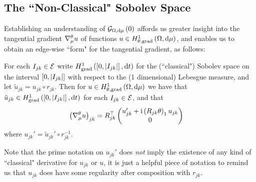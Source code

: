 \subsection{The ``Non-Classical" Sobolev Space} \label{appS:SobSpacesTheory}
Establishing an understanding of $\mathcal{G}_{ \Omega, \mathrm{d}\mu}\left( 0 \right)$  affords us greater insight into the tangential gradient $\nabla^{\theta}_\mu u$ of functions $u\in H^1_{\theta, \mathrm{grad}}\left( \Omega, \mathrm{d}\mu \right)$, and enables us to obtain an edge-wise ``form" for the tangential gradient, as follows:
\begin{prop} \label{prop:GraphTangGrad}
	For each $I_{jk}\in \mathcal{E}$ write $H^1_\mathrm{grad}\left( \left[ 0,\left\lvert I_{jk} \right\rvert \right], \mathrm{d}t \right)$ for the (``classical") Sobolev space on the interval $\left[ 0,\left\lvert I_{jk} \right\rvert \right]$ with respect to the (1 dimensional) Lebesgue measure, and let $\tilde{u}_{jk} = u_{jk} \circ r_{jk}$.
	Then for $u\in H^1_{\theta, \mathrm{grad}}\left( \Omega, \mathrm{d}\mu \right)$ we have that $\tilde{u}_{jk}\in H^1_\mathrm{grad}\left( \left[ 0,\left\lvert I_{jk} \right\rvert \right], \mathrm{d}t \right)$ for each $I_{jk}\in \mathcal{E}$, and that
	\begin{align*}
		\left(  \nabla^{\theta}_\mu u  \right)_{jk} 
		&= R_{jk}^\top \begin{pmatrix} u_{jk}' + \mathrm{i}\left( R_{jk}\theta \right)_1 u_{jk} \\ 0	\end{pmatrix}
	\end{align*}
	where $u_{jk}' = \tilde{u}_{jk}' \circ r_{jk}^{-1}$.
\end{prop}
Note that the prime notation on $u_{jk}'$ does \emph{not} imply the existence of any kind of ``classical" derivative for $u_{jk}$ or $u$, it is just a helpful piece of notation to remind us that $u_{jk}$ does have some regularity after composition with $r_{jk}$.
